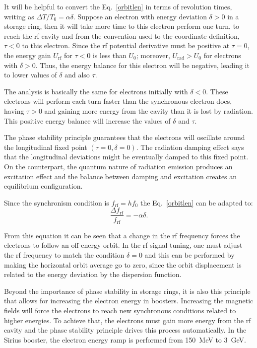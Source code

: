 It will be helpful to convert the Eq.~\eqref{orbitlen} in terms of revolution times, writing as $\Delta T/T_0 = \alpha \delta$. Suppose an electron with energy deviation $\delta > 0$ in a storage ring, then it will take more time to this electron perform one turn, to reach the \gls{rf} cavity and from the convention used to the coordinate definition, $\tau < 0$ to this electron. Since the \gls{rf} potential derivative must be positive at $\tau = 0$, the energy gain $U_{\mathrm{rf}}$ for $\tau < 0$ is less than $U_0$; moreover, $U_{\mathrm{rad}} > U_0$ for electrons with $\delta > 0$. Thus, the energy balance for this electron will be negative, leading it to lower values of $\delta$ and also $\tau$.

The analysis is basically the same for electrons initially with $\delta < 0$. These electrons will perform each turn faster than the synchronous electron does, having $\tau > 0$ and gaining more energy from the cavity than it is lost by radiation. This positive energy balance will increase the values of $\delta$ and $\tau$.

The phase stability principle guarantees that the electrons will oscillate around the longitudinal fixed point $(\tau = 0, \delta = 0)$. The radiation damping effect says that the longitudinal deviations might be eventually damped to this fixed point. On the counterpart, the quantum nature of radiation emission produces an excitation effect and the balance between damping and excitation creates an equilibrium configuration.

Since the synchronism condition is $f_{\mathrm{rf}} = h f_0$ the Eq.~\eqref{orbitlen} can be adapted to:
\begin{equation}
    \dfrac{\Delta f_{\mathrm{rf}}}{f_{\mathrm{rf}}} = -\alpha \delta.
    \label{eq:delta_freq}
\end{equation}

From this equation it can be seen that a change in the \gls{rf} frequency forces the electrons to follow an off-energy orbit. In the \gls{rf} signal tuning, one must adjust the \gls{rf} frequency to match the condition $\delta = 0$ and this can be performed by making the horizontal orbit average go to zero, since the orbit displacement is related to the energy deviation by the dispersion function.

Beyond the importance of phase stability in storage rings, it is also this principle that allows for increasing the electron energy in boosters. Increasing the magnetic fields will force the electrons to reach new synchronous conditions related to higher energies. To achieve that, the electrons must gain more energy from the \gls{rf} cavity and the phase stability principle drives this process automatically. In the Sirius booster, the electron energy ramp is performed from \SI{150}{\mega \electronvolt} to \SI{3}{\giga \electronvolt}.
